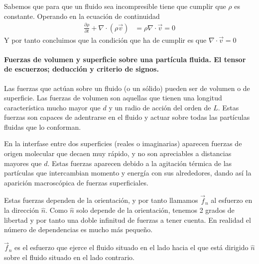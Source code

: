 \documentclass[a4paper]{article}
\begin{document}
Sabemos que para que un fluido sea incompresible tiene que cumplir que
$\rho$ es constante. Operando en la ecuación de continuidad
\begin{align*}
	\frac{\partial \rho}{\partial t} + \nabla \cdot (\rho \vec{v}) &= 
\rho\nabla\cdot  \vec{v} = 0
\end{align*}
Y por tanto concluimos que la condición que ha de cumplir es que $\nabla \cdot  \vec{v} = 0$

\newpage
\paragraph{Fuerzas de volumen y superficie sobre una partícula fluida.
El tensor de escuerzos; deducción y criterio de signos.} 
Las fuerzas que actúan sobre un fluido (o un sólido) pueden ser 
de volumen o de superficie. Las fuerzas de volumen son aquellas que 
tienen una longitud característica mucho mayor que $d$ y un radio
de acción del orden de $L$. Estas fuerzas son capaces de adentrarse
en el fluido y actuar sobre todas las partículas fluidas que lo 
conforman.

En la interfase entre dos superficies (reales o imaginarias) aparecen
fuerzas de origen molecular que decaen muy rápido, y no son 
apreciables a distancias mayores que $d$. Estas fuerzas aparecen
debido a la agitación térmica de las partículas que intercambian 
momento y energía con sus alrededores, dando así la aparición 
macroscópica de fuerzas superficiales. 

Estas fuerzas dependen de la orientación, y por tanto llamamos
$\vec{f}_n$ al esfuerzo en la dirección $\hat{n}$. Como $\hat{n}$ solo
depende de la orientación, tenemos 2 grados de libertad y por tanto
una doble infinitud de fuerzas a tener cuenta. En realidad el número
de dependencias es mucho más pequeño. 

$\vec{f}_n$ es el esfuerzo que ejerce el fluido situado en el lado hacia el que 
está dirigido $\hat{n}$ sobre el fluido situado en el lado contrario.
\end{document}
